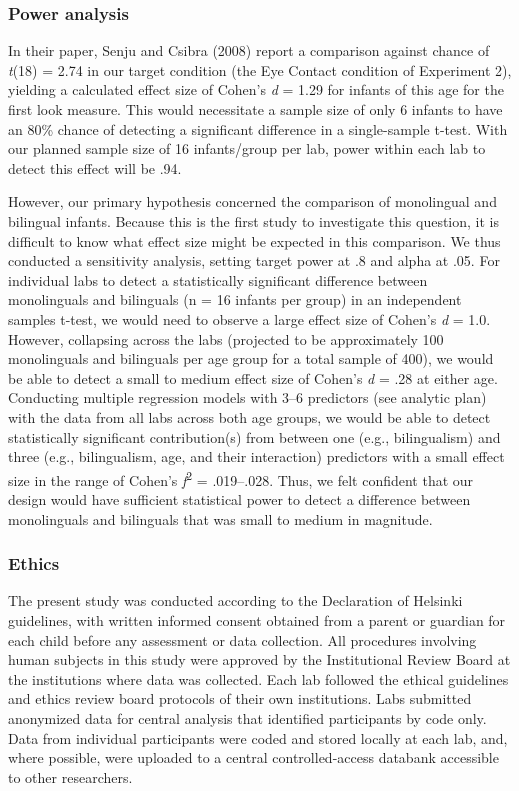 \documentclass[,man,floatsintext]{apa6}
\begin{document}
\hypertarget{power-analysis}{%
\subsubsection{Power analysis}\label{power-analysis}}

In their paper, Senju and Csibra (2008) report a comparison against chance of \emph{t}(18) = 2.74 in our target condition (the Eye Contact condition of Experiment 2), yielding a calculated effect size of Cohen's \emph{d} = 1.29 for infants of this age for the first look measure. This would necessitate a sample size of only 6 infants to have an 80\% chance of detecting a significant difference in a single-sample t-test. With our planned sample size of 16 infants/group per lab, power within each lab to detect this effect will be .94.

However, our primary hypothesis concerned the comparison of monolingual and bilingual infants. Because this is the first study to investigate this question, it is difficult to know what effect size might be expected in this comparison. We thus conducted a sensitivity analysis, setting target power at .8 and alpha at .05. For individual labs to detect a statistically significant difference between monolinguals and bilinguals (n = 16 infants per group) in an independent samples t-test, we would need to observe a large effect size of Cohen's \emph{d} = 1.0. However, collapsing across the labs (projected to be approximately 100 monolinguals and bilinguals per age group for a total sample of 400), we would be able to detect a small to medium effect size of Cohen's \emph{d} = .28 at either age. Conducting multiple regression models with 3--6 predictors (see analytic plan) with the data from all labs across both age groups, we would be able to detect statistically significant contribution(s) from between one (e.g., bilingualism) and three (e.g., bilingualism, age, and their interaction) predictors with a small effect size in the range of Cohen's \emph{ƒ}\textsuperscript{2} = .019--.028. Thus, we felt confident that our design would have sufficient statistical power to detect a difference between monolinguals and bilinguals that was small to medium in magnitude.

\hypertarget{ethics}{%
\subsubsection{Ethics}\label{ethics}}

The present study was conducted according to the Declaration of Helsinki guidelines, with written informed consent obtained from a parent or guardian for each child before any assessment or data collection. All procedures involving human subjects in this study were approved by the Institutional Review Board at the institutions where data was collected. Each lab followed the ethical guidelines and ethics review board protocols of their own institutions. Labs submitted anonymized data for central analysis that identified participants by code only. Data from individual participants were coded and stored locally at each lab, and, where possible, were uploaded to a central controlled-access databank accessible to other researchers.
\end{document}
